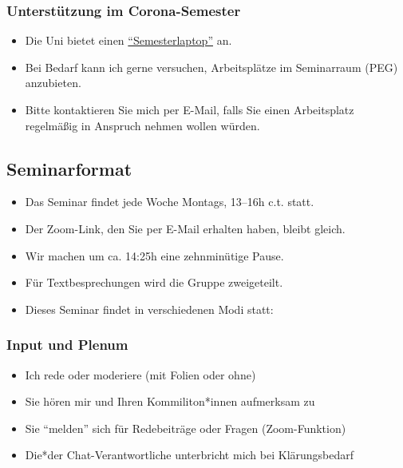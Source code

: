 \documentclass[11pt,german,a4paper]{article}
\providecommand{\tightlist}{%
  \setlength{\itemsep}{0pt}\setlength{\parskip}{0pt}}
\begin{document}
\hypertarget{unterstuxfctzung-im-corona-semester}{%
\subsubsection{Unterstützung im Corona-Semester}\label{unterstuxfctzung-im-corona-semester}}

\begin{itemize}
\tightlist
\item
  Die Uni bietet einen \href{https://www.starkerstart.uni-frankfurt.de/92914986/ContentPage_92914986}{``Semesterlaptop''} an.
\item
  Bei Bedarf kann ich gerne versuchen, Arbeitsplätze im Seminarraum (PEG) anzubieten.
\item
  Bitte kontaktieren Sie mich per E-Mail, falls Sie einen Arbeitsplatz regelmäßig in Anspruch nehmen wollen würden.
\end{itemize}

\hypertarget{seminarformat}{%
\subsection{Seminarformat}\label{seminarformat}}

\begin{itemize}
\tightlist
\item
  Das Seminar findet jede Woche Montags, 13--16h c.t. statt.
\item
  Der Zoom-Link, den Sie per E-Mail erhalten haben, bleibt gleich.
\item
  Wir machen um ca. 14:25h eine zehnminütige Pause.
\item
  Für Textbesprechungen wird die Gruppe zweigeteilt.
\item
  Dieses Seminar findet in verschiedenen Modi statt:
\end{itemize}

\hypertarget{input-und-plenum}{%
\subsubsection{Input und Plenum}\label{input-und-plenum}}

\begin{itemize}
\tightlist
\item
  Ich rede oder moderiere (mit Folien oder ohne)
\item
  Sie hören mir und Ihren Kommiliton*innen aufmerksam zu
\item
  Sie ``melden'' sich für Redebeiträge oder Fragen (Zoom-Funktion)
\item
  Die*der Chat-Verantwortliche unterbricht mich bei Klärungsbedarf
\end{itemize}
\end{document}
